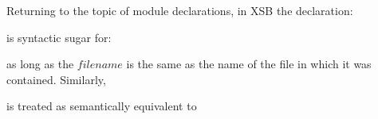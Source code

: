 %
%
%
%
%


Returning to the topic of module declarations, in XSB the declaration:


\noindent
is syntactic sugar for:


\noindent
as long as the $filename$ is the same as the name of the file in which
it was contained.  Similarly,


\noindent
is treated as semantically equivalent to 

